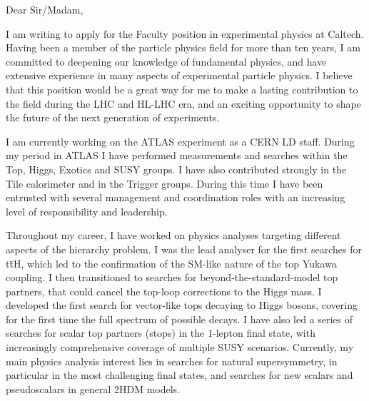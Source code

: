 \documentclass[11pt,a4paper,sans]{moderncv}        %
\begin{document}
\makecvtitle
\cvitem{}{
}
\vspace{3.4 cm}
Dear Sir/Madam,
\newline

I am writing to apply for the Faculty position in experimental physics at Caltech.
Having been a member of the particle physics field for more than ten years, I am committed to deepening our knowledge of fundamental physics, and have extensive experience in many aspects of experimental particle physics. I believe that this position would be a great way for me to make a lasting contribution to the field during the LHC and HL-LHC era, and an exciting opportunity to shape the future of the next generation of experiments.
\newline

I am currently working on the ATLAS experiment as a CERN LD staff. During my period in ATLAS I have performed measurements and searches within the Top, Higgs, Exotics and SUSY groups. I have also contributed strongly in the Tile calorimeter and in the Trigger groups. During this time I have been entrusted with several management and coordination roles with an increasing level of responsibility and leadership. 
\newline

Throughout my career, I have worked on physics analyses targeting different aspects of the hierarchy problem. I was the lead analyser for the first searches for t\=tH, which led to the confirmation of the SM-like nature of the top Yukawa coupling. I then transitioned to searches for beyond-the-standard-model top partners, that could cancel the top-loop corrections to the Higgs mass. I developed the first search for vector-like tops decaying to Higgs bosons, covering for the first time the full spectrum of possible decays. I have also led a series of searches for scalar top partners (stops) in the 1-lepton final state, with increasingly comprehensive coverage of multiple SUSY scenarios. Currently, my main physics analysis interest lies in searches for natural supersymmetry, in particular in the most challenging final states, and searches for new scalars and pseudoscalars in general 2HDM models. 
\newline
\end{document}
